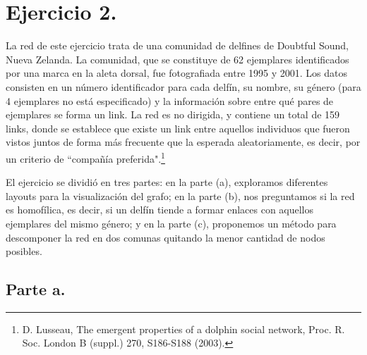 
\section{Ejercicio 2.}

La red de este ejercicio trata de una comunidad de delfines de Doubtful Sound, Nueva Zelanda. La comunidad, que se constituye de 62 ejemplares identificados por una marca en la aleta dorsal, fue fotografiada entre 1995 y 2001. Los datos consisten en un número identificador para cada delfín, su nombre, su género (para 4 ejemplares no está especificado) y la información sobre entre qué pares de ejemplares se forma un link. La red es no dirigida, y contiene un total de 159 links, donde se establece que existe un link entre aquellos individuos que fueron vistos juntos de forma más frecuente que la esperada aleatoriamente, es decir, por un criterio de ``compañía preferida".\footnote{D. Lusseau, The emergent properties of a dolphin social network, Proc. R. Soc. London B (suppl.) 270, S186-S188 (2003).}
\par El ejercicio se dividió en tres partes: en la parte (a), exploramos diferentes layouts para la visualización del grafo; en la parte (b), nos preguntamos si la red es homofílica, es decir, si un delfín tiende a formar enlaces con aquellos ejemplares del mismo género; y en la parte (c), proponemos un método para descomponer la red en dos comunas quitando la menor cantidad de nodos posibles.

\subsection{Parte a.}

